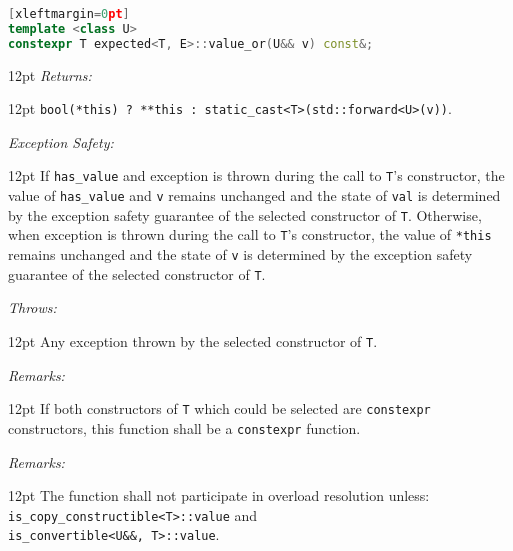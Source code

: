 \documentclass[a4paper,10pt]{article}
\newcommand{\cpp}[1]{\lstinline{#1}}
\newcommand{\wordingItem}[1]{\noindent\textit{#1:}}
\newenvironment{wordingTextItem}[1]{\wordingItem{#1}\vspace{2pt}\noindent\begin{adjustwidth}{12pt}{}}{\vspace{2pt}\end{adjustwidth}}
\newenvironment{wordingPara}{\begin{adjustwidth}{12pt}{}}{\end{adjustwidth}}
\begin{document}
\begin{lstlisting}[language=C++][xleftmargin=0pt]
template <class U>
constexpr T expected<T, E>::value_or(U&& v) const&; 
\end{lstlisting}
\begin{wordingPara}
\begin{wordingTextItem}{Returns}
\cpp{bool(*this) ? **this : static_cast<T>(std::forward<U>(v))}.
\end{wordingTextItem}
\begin{wordingTextItem}{Exception Safety}
If \cpp{has_value} and exception is thrown during the call to \cpp{T}'s constructor, the value of \cpp{has_value} and \cpp{v} remains unchanged and the state of \cpp{val} is determined by the exception safety guarantee of the selected constructor of \cpp{T}. Otherwise, when exception is thrown during the call to \cpp{T}'s constructor, the value of \cpp{*this} remains unchanged and the state of \cpp{v} is determined by the exception safety guarantee of the selected constructor of \cpp{T}.
\end{wordingTextItem}
\begin{wordingTextItem}{Throws}
Any exception thrown by the selected constructor of \cpp{T}.
\end{wordingTextItem}
\begin{wordingTextItem}{Remarks}
If both constructors of \cpp{T} which could be selected are \cpp{constexpr} constructors, this function shall be a \cpp{constexpr} function.
\end{wordingTextItem}
\begin{wordingTextItem}{Remarks}
The function shall not participate in overload resolution unless: \\
\cpp{is_copy_constructible<T>::value} and \\
\cpp{is_convertible<U&&, T>::value}.
\end{wordingTextItem}
\end{wordingPara}
\end{document}
